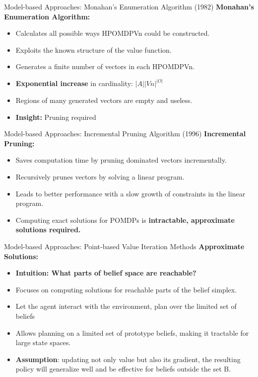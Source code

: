 \documentclass[presentation, smaller]{beamer}
\begin{document}
\begin{frame}{Model-based Approaches: Monahan’s Enumeration Algorithm (1982)}
  \textbf{Monahan’s Enumeration Algorithm:}
  \begin{itemize}
    \item Calculates all possible ways HPOMDPVn could be constructed.
    \item Exploits the known structure of the value function.
    \item Generates a finite number of vectors in each HPOMDPVn.
    \item \textbf{Exponential increase} in cardinality: $|A||Vn|^{|O|}$
    \item Regions of many generated vectors are empty and useless.
    \item \textbf{Insight:} Pruning required

  \end{itemize}

\end{frame}
\begin{frame}{Model-based Approaches: Incremental Pruning Algorithm (1996)}
  \textbf{Incremental Pruning:}
  \begin{itemize}
    \item Saves computation time by pruning dominated vectors incrementally.
    \item Recursively prunes vectors by solving a linear program. 
    \item Leads to better performance with a slow growth of constraints in the linear program.
    \item Computing exact solutions for POMDPs is \textbf{intractable, approximate solutions required.}
    
  \end{itemize}
\end{frame}

\begin{frame}{Model-based Approaches: Point-based Value Iteration Methods}
  \textbf{Approximate Solutions:}
  \begin{itemize}
    \item \textbf{Intuition: What parts of belief space are reachable? }
    \item Focuses on computing solutions for reachable parts of the belief simplex.
    \item Let the agent interact with the environment, plan over the limited set of beliefs
    \item Allows planning on a limited set of prototype beliefs, making it tractable for large state spaces.
    \item \textbf{Assumption}: updating not only value but also its gradient, the
resulting policy will generalize well and be effective for beliefs outside the set B.
  \end{itemize}
\end{frame}
\end{document}
